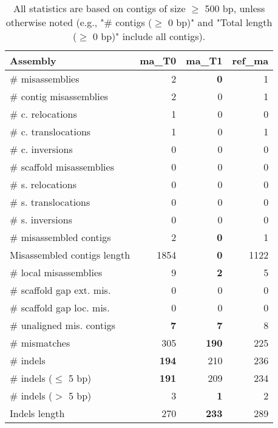 \documentclass[12pt,a4paper]{article}
\begin{document}
\begin{table}[ht]
\begin{center}
\caption{All statistics are based on contigs of size $\geq$ 500 bp, unless otherwise noted (e.g., "\# contigs ($\geq$ 0 bp)" and "Total length ($\geq$ 0 bp)" include all contigs).}
\begin{tabular}{|l*{3}{|r}|}
\hline
Assembly & ma\_T0 & ma\_T1 & ref\_ma \\ \hline
\# misassemblies & 2 & {\bf 0} & 1 \\ \hline
\hspace{2mm}\# contig misassemblies & 2 & 0 & 1 \\ \hline
\hspace{5mm}\# c. relocations & 1 & 0 & 0 \\ \hline
\hspace{5mm}\# c. translocations & 1 & 0 & 1 \\ \hline
\hspace{5mm}\# c. inversions & 0 & 0 & 0 \\ \hline
\hspace{2mm}\# scaffold misassemblies & 0 & 0 & 0 \\ \hline
\hspace{5mm}\# s. relocations & 0 & 0 & 0 \\ \hline
\hspace{5mm}\# s. translocations & 0 & 0 & 0 \\ \hline
\hspace{5mm}\# s. inversions & 0 & 0 & 0 \\ \hline
\# misassembled contigs & 2 & {\bf 0} & 1 \\ \hline
Misassembled contigs length & 1854 & {\bf 0} & 1122 \\ \hline
\# local misassemblies & 9 & {\bf 2} & 5 \\ \hline
\# scaffold gap ext. mis. & 0 & 0 & 0 \\ \hline
\# scaffold gap loc. mis. & 0 & 0 & 0 \\ \hline
\# unaligned mis. contigs & {\bf 7} & {\bf 7} & 8 \\ \hline
\# mismatches & 305 & {\bf 190} & 225 \\ \hline
\# indels & {\bf 194} & 210 & 236 \\ \hline
\hspace{5mm}\# indels ($\leq$ 5 bp) & {\bf 191} & 209 & 234 \\ \hline
\hspace{5mm}\# indels ($>$ 5 bp) & 3 & {\bf 1} & 2 \\ \hline
Indels length & 270 & {\bf 233} & 289 \\ \hline
\end{tabular}
\end{center}
\end{table}
\end{document}
